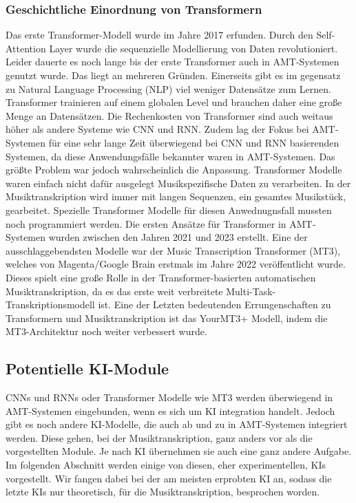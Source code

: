 \subsubsection*{Geschichtliche Einordnung von Transformern}
Das erste Transformer-Modell wurde im Jahre 2017 erfunden.
\cite{vaswani2017attention}
Durch den Self-Attention Layer wurde die sequenzielle Modellierung von Daten revolutioniert.
Leider dauerte es noch lange bis der erste Transformer auch in AMT-Systemen genutzt wurde.
Das liegt an mehreren Gründen.
Einerseits gibt es im gegensatz zu Natural Language Processing (NLP) viel weniger Datensätze zum Lernen.
Transformer trainieren auf einem globalen Level und brauchen daher eine große Menge an Datensätzen.
Die Rechenkosten von Transformer sind auch weitaus höher als andere Systeme wie CNN und RNN.
Zudem lag der Fokus bei AMT-Systemen für eine sehr lange Zeit überwiegend bei CNN und RNN basierenden Systemen,
da diese Anwendungsfälle bekannter waren in AMT-Systemen.
Das größte Problem war jedoch wahrscheinlich die Anpassung.
Transformer Modelle waren einfach nicht dafür ausgelegt Musikspezifische Daten zu verarbeiten.
In der Musiktranskription wird immer mit langen Sequenzen, ein gesamtes Musikstück, gearbeitet.
Spezielle Transformer Modelle für diesen Anwednugnsfall mussten noch programmiert werden.
Die ersten Ansätze für Transformer in AMT-Systemen wurden zwischen den Jahren 2021 und 2023 erstellt.
Eine der ausschlaggebendsten Modelle war der Music Transcription Transformer (MT3),
welches von Magenta/Google Brain erstmals im Jahre 2022 veröffentlicht wurde.
\cite{gardner2021mt3}
Dieses spielt eine große Rolle in der Transformer-basierten automatischen Musiktranskription,
da es das erste weit verbreitete Multi-Task-Transkriptionsmodell ist.
Eine der Letzten bedeutenden Errungenschaften zu Transformern und Musiktranskription ist das
YourMT3+ Modell, indem die MT3-Architektur noch weiter verbessert wurde.
\cite{chang2024yourmt3}

\subsection{Potentielle KI-Module}
CNNs und RNNs oder Transformer Modelle wie MT3 werden überwiegend in AMT-Systemen eingebunden,
wenn es sich um KI integration handelt.
Jedoch gibt es noch andere KI-Modelle, die auch ab und zu in AMT-Systemen integriert werden.
Diese gehen, bei der Musiktranskription, ganz anders vor als die vorgestellten Module.
Je nach KI übernehmen sie auch eine ganz andere Aufgabe.
Im folgenden Abschnitt werden einige von diesen, eher experimentellen, KIs vorgestellt.
Wir fangen dabei bei der am meisten erprobten KI an,
sodass die letzte KIs nur theoretisch, für die Musiktranskription, besprochen worden.

